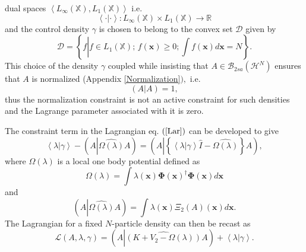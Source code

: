 \documentclass[aps,preprint]{revtex4}%
\begin{document}
dual spaces $\left\langle L_{\infty}\left(  \mathbb{X}\right)  ,L_{1}\left(
\mathbb{X}\right)  \right\rangle $ i.e.
\begin{equation}
\left\langle \cdot|\cdot\right\rangle :L_{\infty}\left(  \mathbb{X}\right)
\times L_{1}\left(  \mathbb{X}\right)  \rightarrow\mathbb{R}%
\end{equation}
and the control density $\gamma$ is chosen to belong to the convex set
$\mathcal{D}$ given by
\begin{equation}
\mathcal{D}=\left\{  f\left\vert f\in L_{1}\left(  \mathbb{X}\right)
;\,f\left(  \boldsymbol{x}\right)  \geq0;\int f\left(  \boldsymbol{x}\right)
d\boldsymbol{x}=N\right.  \right\}  .
\end{equation}
This choice of the density $\gamma$ coupled while insisting that
$A\in\mathcal{B}_{2sa}\left(  \mathcal{H}^{N}\right)  $ ensures that $A$ is
normalized (Appendix \ref{Normalization}$),$ i.e.
\begin{equation}
\left(  A\left\vert A\right.  \right)  =1,
\end{equation}
thus the normalization constraint is not an active constraint for such
densities and the Lagrange parameter associated with it is zero.

The constraint term in the Lagrangian eq. $\left(  \ref{Lar}\right)  $ can be
developed to give
\begin{equation}
\left\langle \lambda\left\vert \gamma\right.  \right\rangle -\left(
A\left\vert \widehat{\Omega\left(  \lambda\right)  }\right.  A\right)
=\left(  A\left\vert \left\{  \left\langle \lambda\left\vert \gamma\right.
\right\rangle \hat{I}-\widehat{\Omega\left(  \lambda\right)  }\right\}
\right.  A\right)  ,
\end{equation}
where $\Omega\left(  \lambda\right)  $ is a local one body potential defined
as
\begin{equation}
\Omega\left(  \lambda\right)  =\int\lambda\left(  \boldsymbol{x}\right)
\boldsymbol{\Phi}\left(  \boldsymbol{x}\right)  ^{\dagger}\boldsymbol{\Phi
}\left(  \boldsymbol{x}\right)  d\boldsymbol{x}%
\end{equation}
and
\begin{equation}
\left(  A\left\vert \widehat{\Omega\left(  \lambda\right)  }\right.  A\right)
=\int\lambda\left(  \boldsymbol{x}\right)  \Xi_{2}\left(  A\right)  \left(
\boldsymbol{x}\right)  d\boldsymbol{x.}%
\end{equation}
The Lagrangian for a fixed $N$-particle density can then be recast as
\begin{equation}
\mathcal{L}\left(  A,\lambda,\gamma\right)  =\left(  A\left\vert
\widehat{\left(  K+V_{2}-\Omega\left(  \lambda\right)  \right)  }A\right.
\right)  +\left\langle \lambda\left\vert \gamma\right.  \right\rangle .
\end{equation}
\end{document}
